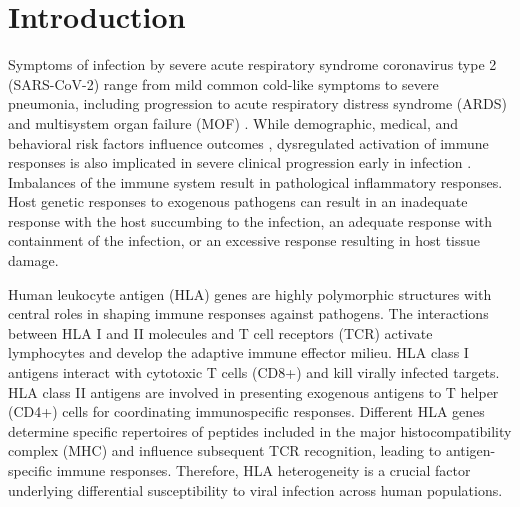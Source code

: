\documentclass[utf8]{frontiersinFPHY_FAMS} %
\begin{document}
\section{Introduction}

Symptoms of infection by severe acute respiratory syndrome coronavirus type 2 (SARS-CoV-2) range from mild common cold-like symptoms to severe pneumonia, including progression to acute respiratory distress syndrome (ARDS) and multisystem organ failure (MOF) \citep{32064853, 32134116}. While demographic, medical, and behavioral risk factors influence outcomes \citep{32335169}, dysregulated activation of immune responses is also implicated in severe clinical progression early in infection \citep{31986264, 32085846}. Imbalances of the immune system result in pathological inflammatory responses. Host genetic responses to exogenous pathogens can result in an inadequate response with the host succumbing to the infection, an adequate response with containment of the infection, or an excessive response resulting in host tissue damage. 

Human leukocyte antigen (HLA) genes are highly polymorphic structures with central roles in shaping immune responses against pathogens. The interactions between HLA I and II molecules and T cell receptors (TCR) activate lymphocytes and develop the adaptive immune effector milieu. HLA class I antigens interact with cytotoxic T cells (CD8+) and kill virally infected targets. HLA class II antigens are involved in presenting exogenous antigens to T helper (CD4+) cells for coordinating immunospecific responses. Different HLA genes determine specific repertoires of peptides included in the major histocompatibility complex (MHC) and influence subsequent TCR recognition, leading to antigen-specific immune responses. Therefore, HLA heterogeneity is a crucial factor underlying differential susceptibility to viral infection across human populations.  
\end{document}
